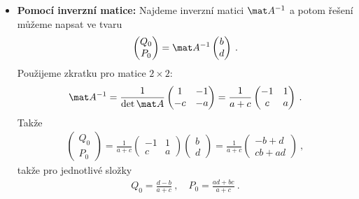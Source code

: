 \begin{example}
\begin{itemize}
        \item \textbf{Pomocí inverzní matice:}
        Najdeme inverzní matici $\mat A^{-1}$ a potom řešení můžeme napsat ve tvaru
        \begin{align}
            \begin{pmatrix}
                Q_0 \\ P_0
            \end{pmatrix}
            = \mat A^{-1} \begin{pmatrix}
                b \\ d
            \end{pmatrix} \:.
        \end{align} 
        Použijeme zkratku pro matice $2 \times 2$: \begin{align}
            \mat A^{-1} = \frac{1}{\det \mat A}\begin{pmatrix}
                1 & -1  \\ -c & -a
            \end{pmatrix} = \frac{1}{a+c} \begin{pmatrix}
                -1 & 1  \\ c & a
            \end{pmatrix} \:.
        \end{align}
        Takže \begin{align}
            \begin{pmatrix}
                Q_0 \\ P_0
            \end{pmatrix}
            = \frac{1}{a+c}
            \begin{pmatrix}
                -1 & 1  \\ c & a
            \end{pmatrix}
            \begin{pmatrix}
                b \\ d
            \end{pmatrix}
            = \frac{1}{a+c} \begin{pmatrix}
                -b+d \\ cb + ad
            \end{pmatrix} \:,
        \end{align}
        takže pro jednotlivé složky
        \begin{align}
            \boxed{ Q_0 = \frac{d-b}{a+c} \:, \quad P_0 = \frac{ad+bc}{a+c} }\:.
        \end{align}
    \end{itemize}
    
    
\end{example}